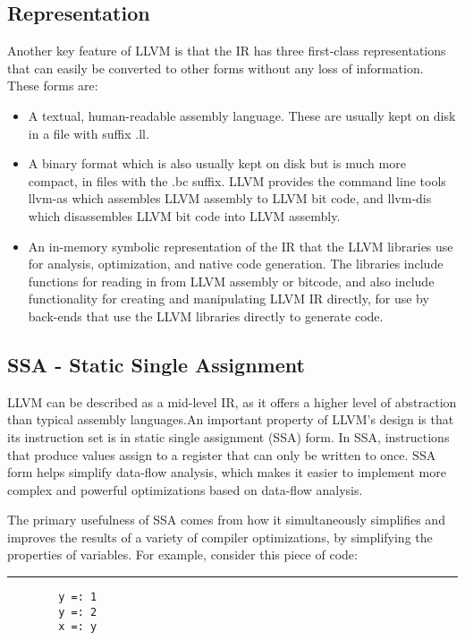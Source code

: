 \documentclass{book}
\begin{document}
	\subsection{Representation}
	Another key feature of LLVM is that the IR has three first-class representations that can easily be converted to other forms without any loss of information. These forms are:
	\begin{itemize}
		\item A textual, human-readable assembly language. These are usually kept on disk in a file with suffix .ll.
		\item A binary format which is also usually kept on disk but is much more compact, in files with the .bc suffix. LLVM provides the command line tools llvm-as	which assembles LLVM assembly to LLVM bit code, and llvm-dis which disassembles LLVM bit code into LLVM assembly.
		\item An in-memory symbolic representation of the IR that the LLVM libraries use for analysis, optimization, and native code generation. The libraries include functions for	reading in from LLVM assembly or bitcode, and also include functionality for creating and manipulating LLVM IR directly, for use by back-ends that use the LLVM	libraries directly to generate code.
	\end{itemize} 

	\subsection{SSA - Static Single Assignment}
	LLVM can be described as a mid-level IR, as it offers a higher level of abstraction than typical assembly languages.An important property of LLVM's design is that its instruction set is in static single assignment (SSA) form.  In SSA, instructions that produce values assign to a register that can only be written to once.  SSA form helps simplify data-flow analysis, which makes it easier to implement more complex and powerful optimizations based on data-flow analysis.
	
	The primary usefulness of SSA comes from how it simultaneously simplifies and improves the results of a variety of compiler optimizations, by simplifying the properties of variables. For example, consider this piece of code: \newline
	 
    \noindent\rule{12cm}{0.4pt}
	
	\begin{verbatim}
		y =: 1 
		y =: 2 
		x =: y
	\end{verbatim}
	
\end{document}
